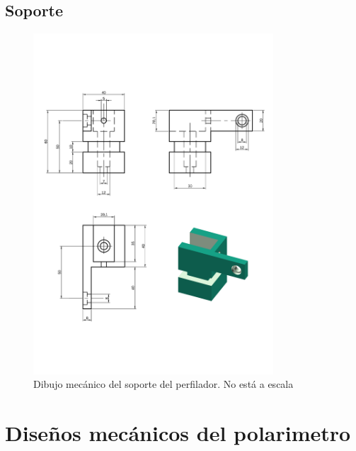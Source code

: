 \documentclass[12pt,a4paper]{article}
\begin{document}
    \subsection{Soporte}
    \vfill
    \begin{figure}[H]
    \centering
    \includegraphics[width=0.8\textwidth]{fig/perfilador/soporte_v4_mecanico}
    \caption{Dibujo mecánico del soporte del perfilador. No está a escala}
    \label{fig:perfilador/soporte_plano}
    \end{figure}
    \vfill

    \clearpage
    \section{Diseños mecánicos del polarimetro}
\end{document}
